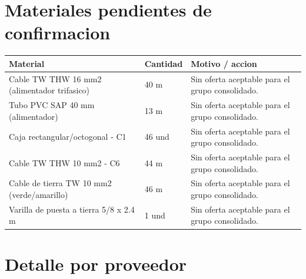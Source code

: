 \documentclass[11pt,a4paper]{article}
\begin{document}
\section{Materiales pendientes de confirmacion}
\begin{longtable}{p{} p{} p{}}
\toprule Material & Cantidad & Motivo / accion \\ \midrule\endhead
Cable TW THW 16 mm2 (alimentador trifasico) & 40 m & Sin oferta aceptable para el grupo consolidado. \\
Tubo PVC SAP 40 mm (alimentador) & 13 m & Sin oferta aceptable para el grupo consolidado. \\
Caja rectangular/octogonal - C1 & 46 und & Sin oferta aceptable para el grupo consolidado. \\
Cable TW THW 10 mm2 - C6 & 44 m & Sin oferta aceptable para el grupo consolidado. \\
Cable de tierra TW 10 mm2 (verde/amarillo) & 46 m & Sin oferta aceptable para el grupo consolidado. \\
Varilla de puesta a tierra 5/8 x 2.4 m & 1 und & Sin oferta aceptable para el grupo consolidado. \\
\bottomrule
\end{longtable}

\section{Detalle por proveedor}
\end{document}
